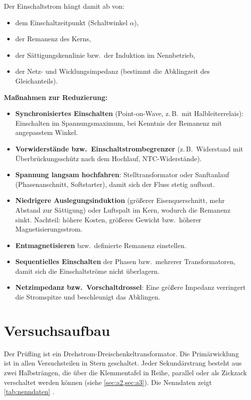\documentclass[a4paper,11pt]{scrreprt}
\begin{document}
Der Einschaltstrom hängt damit ab von:
\begin{itemize}[nosep]
  \item dem Einschaltzeitpunkt (Schaltwinkel $\alpha$),
  \item der Remanenz des Kerns,
  \item der Sättigungskennlinie bzw.\ der Induktion im Nennbetrieb,
  \item der Netz- und Wicklungsimpedanz (bestimmt die Abklingzeit des Gleichanteils).
\end{itemize}

\textbf{Maßnahmen zur Reduzierung:}
\begin{itemize}[nosep]
  \item \textbf{Synchronisiertes Einschalten} (Point-on-Wave, z.\,B.\ mit Halbleiterrelais): Einschalten im Spannungsmaximum, bei Kenntnis der Remanenz mit angepasstem Winkel.
  \item \textbf{Vorwiderstände bzw.\ Einschaltstrombegrenzer} (z.\,B.\ Widerstand mit Überbrückungsschütz nach dem Hochlauf, NTC-Widerstände).
  \item \textbf{Spannung langsam hochfahren}: Stelltransformator oder Sanftanlauf (Phasenanschnitt, Softstarter), damit sich der Fluss stetig aufbaut.
  \item \textbf{Niedrigere Auslegungsinduktion} (größerer Eisenquerschnitt, mehr Abstand zur Sättigung) oder Luftspalt im Kern, wodurch die Remanenz sinkt. Nachteil: höhere Kosten, größeres Gewicht bzw.\ höherer Magnetisierungsstrom.
  \item \textbf{Entmagnetisieren} bzw.\ definierte Remanenz einstellen.
  \item \textbf{Sequentielles Einschalten} der Phasen bzw.\ mehrerer Transformatoren, damit sich die Einschaltströme nicht überlagern.
  \item \textbf{Netzimpedanz bzw.\ Vorschaltdrossel}: Eine größere Impedanz verringert die Stromspitze und beschleunigt das Abklingen.
\end{itemize}



\chapter{Versuchsaufbau}

Der Prüfling ist ein Drehstrom-Dreischenkeltransformator. Die Primärwicklung ist in allen Versuchsteilen in Stern geschaltet. Jeder Sekundärstrang besteht aus zwei Halbsträngen, die über die Klemmentafel in Reihe, parallel oder als Zickzack verschaltet werden können (siehe \cref{sec:a2,sec:a3}). Die Nenndaten zeigt \cref{tab:nenndaten} \cite{landrath2026trafo}.
\end{document}
